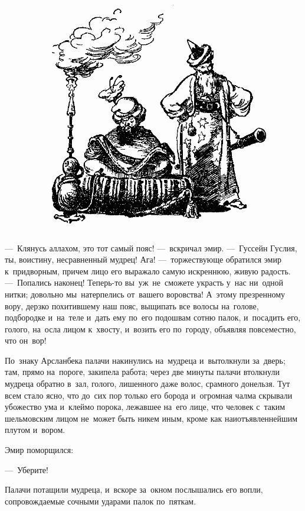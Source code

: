 \documentclass[12pt,a4paper]{book}
\begin{document}
\begin{figure}[h]
\centering
\includegraphics[width=\textwidth]{13.png}
\end{figure}

—~Клянусь аллахом, это тот самый пояс! —~вскричал эмир. —~Гуссейн Гуслия, ты, воистину, несравненный мудрец! Ага! —~торжествующе обратился эмир к~придворным, причем лицо его выражало самую искреннюю, живую радость. —~Попались наконец! Теперь-то вы~уж~не~сможете украсть у~нас ни~одной нитки; довольно мы~натерпелись от~вашего воровства! А~этому презренному вору, дерзко похитившему наш пояс, выщипать все волосы на~голове, подбородке и~на~теле и~дать ему по~его подошвам сотню палок, и~посадить его, голого, на~осла лицом к~хвосту, и~возить его по~городу, объявляя повсеместно, что он~вор!

По~знаку Арсланбека палачи накинулись на~мудреца и~вытолкнули за~дверь; там, прямо на~пороге, закипела работа; через две минуты палачи втолкнули мудреца обратно в~зал, голого, лишенного даже волос, срамного донельзя. Тут всем стало ясно, что до~сих пор только его борода и~огромная чалма скрывали убожество ума и~клеймо порока, лежавшее на~его лице, что человек с~таким шельмовским лицом не~может быть никем иным, кроме как наиотъявленнейшим плутом и~вором.

Эмир поморщился:

—~Уберите!

Палачи потащили мудреца, и~вскоре за~окном послышались его вопли, сопровождаемые сочными ударами палок по~пяткам.
\end{document}
